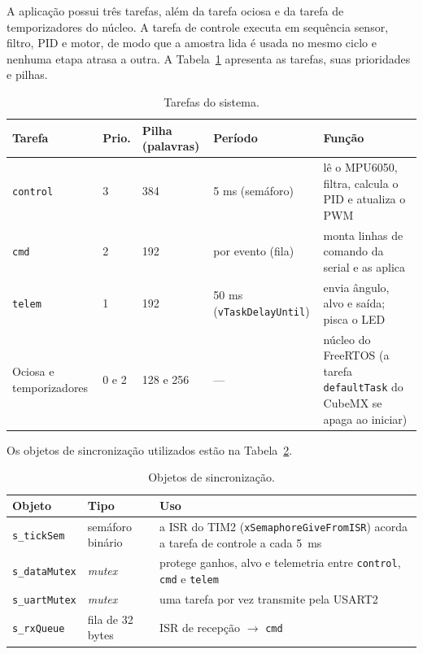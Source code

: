 A aplicação possui três tarefas, além da tarefa ociosa e da tarefa de temporizadores do núcleo. A tarefa de controle executa em sequência sensor, filtro, PID e motor, de modo que a amostra lida é usada no mesmo ciclo e nenhuma etapa atrasa a outra. A Tabela~\ref{tab:tarefas} apresenta as tarefas, suas prioridades e pilhas.
\begin{table}[H]
\centering\caption{Tarefas do sistema.}\label{tab:tarefas}
\begin{tabularx}{\textwidth}{llllX}
\hline\textbf{Tarefa} & \textbf{Prio.} & \textbf{Pilha (palavras)} & \textbf{Período} & \textbf{Função}\\\hline
\texttt{control} & 3 & 384 & 5 ms (semáforo) & lê o MPU6050, filtra, calcula o PID e atualiza o PWM\\
\texttt{cmd} & 2 & 192 & por evento (fila) & monta linhas de comando da serial e as aplica\\
\texttt{telem} & 1 & 192 & 50 ms (\texttt{vTaskDelayUntil}) & envia ângulo, alvo e saída; pisca o LED\\
Ociosa e temporizadores & 0 e 2 & 128 e 256 & --- & núcleo do FreeRTOS (a tarefa \texttt{defaultTask} do CubeMX se apaga ao iniciar)\\\hline
\end{tabularx}
\end{table}

Os objetos de sincronização utilizados estão na Tabela~\ref{tab:objetos}.

\begin{table}[H]
\centering\caption{Objetos de sincronização.}\label{tab:objetos}
\begin{tabularx}{\textwidth}{llX}
\hline\textbf{Objeto} & \textbf{Tipo} & \textbf{Uso}\\\hline
\texttt{s\_tickSem} & semáforo binário & a ISR do TIM2 (\texttt{xSemaphoreGiveFromISR}) acorda a tarefa de controle a cada 5~ms\\
\texttt{s\_dataMutex} & \textit{mutex} & protege ganhos, alvo e telemetria entre \texttt{control}, \texttt{cmd} e \texttt{telem}\\
\texttt{s\_uartMutex} & \textit{mutex} & uma tarefa por vez transmite pela USART2\\
\texttt{s\_rxQueue} & fila de 32 bytes & ISR de recepção $\to$ \texttt{cmd}\\\hline
\end{tabularx}
\end{table}

